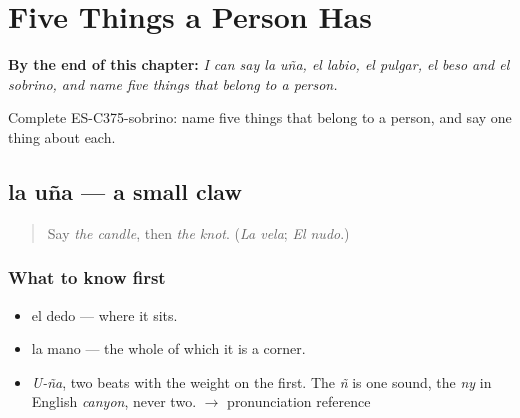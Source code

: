 
\chapter{Five Things a Person Has}
\label{ch:la-una-y-el-labio}

\begin{chapteropening}
\textbf{By the end of this chapter:} \emph{I can say la uña, el labio, el pulgar, el beso and el sobrino, and name five things that belong to a person.}

Complete ES-C375-sobrino: name five things that belong to a person, and say one thing about each.
\end{chapteropening}

\section[la uña]{la uña — a small claw}

\label{lesson:ES-C375-una}



\begin{quote}
Say \emph{the candle}, then \emph{the knot}. (\emph{La vela}; \emph{El nudo}.)
\end{quote}

\subsection*{What to know first}
\begin{itemize}
\raggedright
  \item el dedo — where it sits.
  \item la mano — the whole of which it is a corner.
\end{itemize}

\begin{sounds}
\begin{itemize}
\raggedright
  \item \emph{U-ña}, two beats with the weight on the first. The \emph{ñ} is one sound, the \emph{ny} in English \emph{canyon}, never two. $\to$ pronunciation reference
\end{itemize}
\end{sounds}

